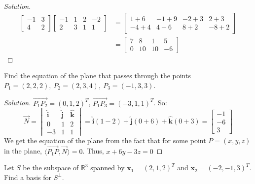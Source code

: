 \documentclass[../main.tex]{subfiles}
\begin{document}
\begin{proof}[Solution]
\begin{align*}
    \begin{bmatrix} -1 & 3 \\ 4 & 2 \end{bmatrix} \begin{bmatrix} -1 & 1 & 2 & -2 \\ 2 & 3 & 1 & 1 \end{bmatrix} &= \begin{bmatrix} 1+6 & -1 + 9 & -2 +3 & 2 + 3 \\ -4 + 4 & 4+6 & 8 + 2 & -8 + 2 \end{bmatrix}\\
    &= \begin{bmatrix} 7 & 8 & 1 & 5 \\ 0 & 10 & 10 & -6 \end{bmatrix}
\end{align*}
\end{proof}
%
\begin{problem}
Find the equation of the plane that passes through the points $P_1 = (2,2,2),\ P_2 = (2,3,4),\ P_3 = (-1,3,3)$.
\end{problem}
\begin{proof}[Solution]
$\overrightarrow{P_1P_2} = (0,1,2)^{T}$, $\overrightarrow{P_1 P_3} = (-3,1,1)^{T}$. So:
%
\begin{equation*}
    \overrightarrow{N} = \begin{vmatrix} \hat{\mathbf{i}} & \hat{\mathbf{j}} & \hat{\mathbf{k}} \\ 0 & 1 & 2 \\ -3 & 1 & 1 \end{vmatrix} = \hat{\mathbf{i}}(1-2) + \hat{\mathbf{j}}(0+6) + \hat{\mathbf{k}}(0+3)=\begin{bmatrix}-1 \\ -6 \\ 3\end{bmatrix}   
\end{equation*}
%
We get the equation of the plane from the fact that for some point $P=(x,y,z)$ in the plane, $\langle \overrightarrow{P_1P}, \overrightarrow{N}\rangle = 0$. Thus, $x + 6y - 3z =0$
\end{proof}
%
\clearpage
%
\begin{problem}
Let $S$ be the subspace of $\mathbb{R}^3$ spanned by $\mathbf{x}_1 = (2,1,2)^T$ and $\mathbf{x}_2 = (-2,-1,3)^T$. Find a basis for $S^{\perp}$.
\end{problem}
\end{document}
